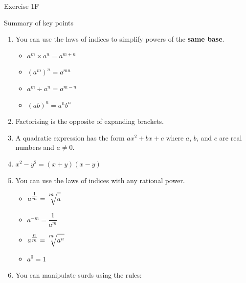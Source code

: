 \documentclass[fleqn]{article}
\begin{document}
\vfill
\begin{practice*}{Exercise 1F}{}
\end{practice*}
\newpage

\begin{mybox2}[colbacktitle=green]{Summary of key points}
	\begin{enumerate}
		\item You can use the laws of indices to simplify powers of the \textbf{same base}.
			\begin{multicols}{2}
				\begin{itemize}
					\item $a^m\times a^n = a^{m+n}$
					\item $(a^m)^n = a^{mn}$
				\end{itemize}
				\columnbreak
				\begin{itemize}
					\setlength{\itemsep}{-3pt}
					\item $a^m\div a^n = a^{m-n}$
					\item $(ab)^n = a^nb^n$
				\end{itemize}
			\end{multicols}
		\item Factorising is the opposite of expanding brackets.
		\item A quadratic expression has the form $ax^2+bx+c$ where $a$, $b$, and $c$ are real numbers and $a\neq0$.
		\item $x^2-y^2=(x+y)(x-y)$
		\item You can use the laws of indices with any rational power.
			\begin{multicols}{2}
				\begin{itemize}
					\item $a^{\textstyle\frac{1}{m}}=\sqrt[\textstyle{^m}]{\strut a}$
					\item $a^{-m}=\dfrac{1}{a^m}$
				\end{itemize}
				\columnbreak
				\begin{itemize}
					\setlength{\itemsep}{-3pt}
					\item $a^{\textstyle\frac{n}{m}}=\sqrt[\textstyle{^m}]{\strut a^n}$
					\item $a^0 = 1$
				\end{itemize}
			\end{multicols}
		\item You can manipulate surds using the rules:
			\begin{multicols}{2}
				\vspace{2mm}
				\begin{itemize}

\end{itemize}
\end{multicols}
\end{enumerate}
\end{mybox2}
\end{document}
